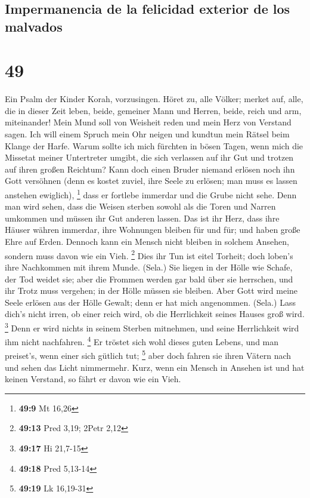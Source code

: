 \hypertarget{impermanencia-de-la-felicidad-exterior-de-los-malvados}{%
\subsection{Impermanencia de la felicidad exterior de los
malvados}\label{impermanencia-de-la-felicidad-exterior-de-los-malvados}}

\hypertarget{section-48}{%
\section{49}\label{section-48}}

 Ein Psalm der Kinder Korah, vorzusingen. 
Höret zu, alle Völker; merket auf, alle, die in dieser Zeit leben,
 beide, gemeiner Mann und Herren, beide, reich und arm,
miteinander!  Mein Mund soll von Weisheit reden und mein
Herz von Verstand sagen.  Ich will einem Spruch mein Ohr
neigen und kundtun mein Rätsel beim Klange der Harfe. 
Warum sollte ich mich fürchten in bösen Tagen, wenn mich die Missetat
meiner Untertreter umgibt,  die sich verlassen auf ihr Gut
und trotzen auf ihren großen Reichtum?  Kann doch einen
Bruder niemand erlösen noch ihn Gott versöhnen  (denn es
kostet zuviel, ihre Seele zu erlösen; man muss es lassen anstehen
ewiglich), \footnote{\textbf{49:9} Mt 16,26}  dass er
fortlebe immerdar und die Grube nicht sehe.  Denn man
wird sehen, dass die Weisen sterben sowohl als die Toren und Narren
umkommen und müssen ihr Gut anderen lassen.  Das ist ihr
Herz, dass ihre Häuser währen immerdar, ihre Wohnungen bleiben für und
für; und haben große Ehre auf Erden.  Dennoch kann ein
Mensch nicht bleiben in solchem Ansehen, sondern muss davon wie ein
Vieh. \footnote{\textbf{49:13} Pred 3,19; 2Petr 2,12} 
Dies ihr Tun ist eitel Torheit; doch loben's ihre Nachkommen mit ihrem
Munde. (Sela.)  Sie liegen in der Hölle wie Schafe, der
Tod weidet sie; aber die Frommen werden gar bald über sie herrschen, und
ihr Trotz muss vergehen; in der Hölle müssen sie bleiben.
 Aber Gott wird meine Seele erlösen aus der Hölle Gewalt;
denn er hat mich angenommen. (Sela.)  Lass dich's nicht
irren, ob einer reich wird, ob die Herrlichkeit seines Hauses groß wird.
\footnote{\textbf{49:17} Hi 21,7-15}  Denn er wird nichts
in seinem Sterben mitnehmen, und seine Herrlichkeit wird ihm nicht
nachfahren. \footnote{\textbf{49:18} Pred 5,13-14}  Er
tröstet sich wohl dieses guten Lebens, und man preiset's, wenn einer
sich gütlich tut; \footnote{\textbf{49:19} Lk 16,19-31} 
aber doch fahren sie ihren Vätern nach und sehen das Licht nimmermehr.
 Kurz, wenn ein Mensch in Ansehen ist und hat keinen
Verstand, so fährt er davon wie ein Vieh.

